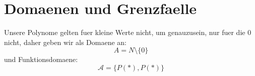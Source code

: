 \documentclass{article}
\begin{document}
	\section{Domaenen und Grenzfaelle}
	Unsere Polynome gelten fuer kleine Werte nicht, um genauzusein, nur fuer die 0 nicht, daher geben wir als Domaene an:
	\[ A = N\setminus\{0\} \]
und Funktionsdomaene:\\
	\[\mathcal{A} = \{P(*),P(*)\}\]
	
	
	
	
	
	
	
	
	
	
	
	
	
	
	
	
	
	
	
	
	
	
	
	
\end{document}
